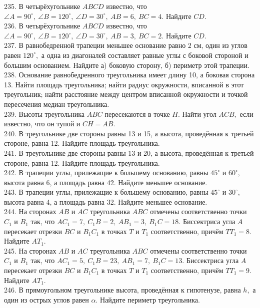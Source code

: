 \documentclass[12pt]{article}
\begin{document}
235. В четырёхугольнике $ABCD$ известно, что $\angle A=90^\circ,\ \angle B=120^\circ,\ \angle D=30^\circ,\ AB=6,\ BC=4.$ Найдите $CD.$\\
236. В четырёхугольнике $ABCD$ известно, что $\angle A=90^\circ,\ \angle B=120^\circ,\ \angle D=30^\circ,\ AB=3,\ BC=2.$ Найдите $CD.$\\
237. В равнобедренной трапеции меньшее основание равно 2 см, один из углов равен $120^\circ,$ а одна из диагоналей составляет равные углы с боковой стороной и большим основанием. Найдите а) боковую сторону, б) периметр этой трапеции.\\
238. Основание равнобедренного треугольника имеет длину 10, а боковая сторона 13. Найти площадь треугольника; найти радиус окружности, вписанной в этот треугольник; найти расстояние между центром вписанной окружности и точкой пересечения медиан треугольника.\\
239. Высоты треугольника $ABC$ пересекаются в точке $H.$ Найти угол $ACB,$ если известно, что он тупой и $CH=AB.$\\
240. В треугольнике две стороны равны 13 и 15, а высота, проведённая к третьей стороне, равна 12. Найдите площадь треугольника.\\
241. В треугольнике две стороны равны 13 и 20, а высота, проведённая к третьей стороне, равна 12. Найдите площадь треугольника.\\
242. В трапеции углы, прилежащие к большему основанию, равны $45^\circ$ и $60^\circ,$ высота равна 6, а площадь равна 42. Найдите меньшее основание.\\
243. В трапеции углы, прилежащие к большему основанию, равны $45^\circ$ и $30^\circ,$ высота равна 4, а площадь равна 32. Найдите меньшее основание.\\
244. На сторонах $AB$ и $AC$ треугольника $ABC$ отмечены соответственно точки $C_1$ и $B_1$ так, что $AC_1=7,\
C_1B=2,\ AB_1=3,\ B_1C=18.$ Биссектриса угла $A$ пересекает отрезки $BC$ и $B_1C_1$ в точках $T$ и $T_1$ соответственно, причём
$TT_1=8.$ Найдите $AT_1.$\\
245. На сторонах $AB$ и $AC$ треугольника $ABC$ отмечены соответственно точки $C_1$ и $B_1$ так, что $AC_1=5,\
C_1B=23,\ AB_1=7,\ B_1C=13.$ Биссектриса угла $A$ пересекает отрезки $BC$ и $B_1C_1$ в точках $T$ и $T_1$ соответственно, причём
$TT_1=9.$ Найдите $AT_1.$\\
246. В прямоугольном треугольнике высота, проведённая к гипотенузе, равна $h,$ а один из острых
углов равен $\alpha.$ Найдите периметр треугольника.\\
\end{document}

